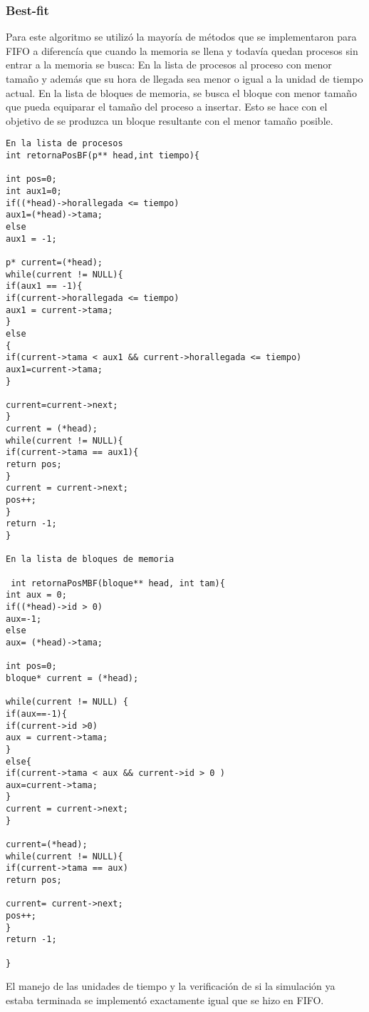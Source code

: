 \documentclass[10pt,a4paper]{article}
\begin{document}
\subsubsection{Best-fit}
Para este algoritmo se utilizó la mayoría de métodos que se implementaron para FIFO a diferencía que cuando la memoria se llena y todavía quedan procesos sin entrar a la memoria se busca:
En la lista de procesos al proceso con menor tamaño y además que su hora de llegada sea menor o igual a la unidad de tiempo actual.
En la lista de bloques de memoria, se busca el bloque con menor tamaño que pueda equiparar el tamaño del proceso a insertar.
Esto se hace con el objetivo de se produzca un bloque resultante con el menor tamaño posible.
\begin{verbatim}
En la lista de procesos
int retornaPosBF(p** head,int tiempo){

int pos=0;
int aux1=0;
if((*head)->horallegada <= tiempo)
aux1=(*head)->tama;
else 
aux1 = -1;

p* current=(*head);
while(current != NULL){
if(aux1 == -1){
if(current->horallegada <= tiempo)
aux1 = current->tama;
}
else
{
if(current->tama < aux1 && current->horallegada <= tiempo)
aux1=current->tama;
}

current=current->next;
}
current = (*head);
while(current != NULL){
if(current->tama == aux1){
return pos;
}
current = current->next;
pos++;
}
return -1;
}

En la lista de bloques de memoria

 int retornaPosMBF(bloque** head, int tam){
int aux = 0;
if((*head)->id > 0)
aux=-1;
else 
aux= (*head)->tama;

int pos=0;
bloque* current = (*head);

while(current != NULL) {
if(aux==-1){
if(current->id >0)
aux = current->tama;
}
else{
if(current->tama < aux && current->id > 0 )
aux=current->tama;
}
current = current->next;
}

current=(*head);
while(current != NULL){
if(current->tama == aux)
return pos;

current= current->next;
pos++;
}
return -1;

}  
\end{verbatim}
El manejo de las unidades de tiempo y la verificación de si la simulación ya estaba terminada se implementó exactamente igual que se hizo en FIFO.
\end{document}
